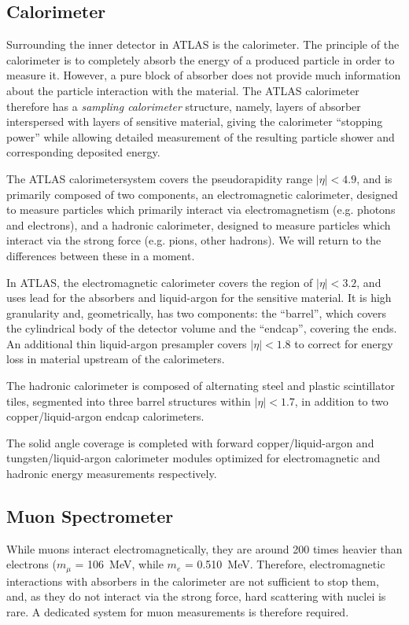 \subsection{Calorimeter}
Surrounding the inner detector in ATLAS is the calorimeter. The principle of the calorimeter is to 
completely absorb the energy of a produced particle in order to measure it. However, a pure block 
of absorber does not provide much information about the particle interaction with the material. 
The ATLAS calorimeter therefore has a \emph{sampling calorimeter} structure, namely, layers 
of absorber interspersed with layers of sensitive material, giving the calorimeter ``stopping power'' 
while allowing detailed measurement of the resulting particle shower and corresponding deposited energy.

The ATLAS calorimetersystem covers the pseudorapidity range \(|\eta| < 4.9\), 
and is primarily composed of two components, an electromagnetic calorimeter, 
designed to measure particles which primarily interact via electromagnetism 
(e.g. photons and electrons), and a hadronic calorimeter, designed to measure 
particles which interact via the strong force (e.g. pions, other hadrons). We 
will return to the differences between these in a moment. 

In ATLAS, the electromagnetic calorimeter covers the region of \(|\eta|< 3.2\),
and uses lead for the absorbers and liquid-argon for the sensitive material. It is high 
granularity and, geometrically, has two components: the ``barrel'', which covers the cylindrical body 
of the detector volume and the ``endcap'', covering the ends. An additional thin liquid-argon presampler 
covers \(|\eta| < 1.8\) to correct for energy loss in material upstream of the calorimeters.

The hadronic calorimeter is composed of alternating steel and plastic scintillator tiles,
segmented into three barrel structures within \(|\eta| < 1.7\), in addition to two copper/liquid-argon 
endcap calorimeters.

The solid angle coverage is completed with forward copper/liquid-argon and tungsten/liquid-argon 
calorimeter modules optimized for electromagnetic and hadronic energy measurements respectively.

\subsection{Muon Spectrometer}
While muons interact electromagnetically, they are around 200 times heavier than electrons 
($m_{\mu}$ = \SI{106}{\MeV}, while $m_{e}$ = \SI{0.510}{\MeV}. 
Therefore, electromagnetic interactions with absorbers in the calorimeter 
are not sufficient to stop them, and, as they do not interact via the strong force, hard scattering with 
nuclei is rare. A dedicated system for muon measurements is therefore required. 

